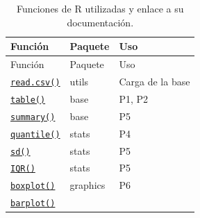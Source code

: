 \documentclass[oneside, openany, fontset=libertinus]{mitthesis}
\begin{document}
\begin{longtable}[]{@{}
  >{\raggedright\arraybackslash}p{}
  >{\raggedright\arraybackslash}p{}
  >{\raggedright\arraybackslash}p{}@{}}
\caption{Funciones de R utilizadas y enlace a su
documentación.}\tabularnewline
\toprule\noalign{}
\begin{minipage}[b]{\linewidth}\raggedright
Función
\end{minipage} & \begin{minipage}[b]{\linewidth}\raggedright
Paquete
\end{minipage} & \begin{minipage}[b]{\linewidth}\raggedright
Uso
\end{minipage} \\
\midrule\noalign{}
\endfirsthead
\toprule\noalign{}
\begin{minipage}[b]{\linewidth}\raggedright
Función
\end{minipage} & \begin{minipage}[b]{\linewidth}\raggedright
Paquete
\end{minipage} & \begin{minipage}[b]{\linewidth}\raggedright
Uso
\end{minipage} \\
\midrule\noalign{}
\endhead
\bottomrule\noalign{}
\endlastfoot
\href{https://stat.ethz.ch/R-manual/R-devel/library/utils/html/read.table.html}{\texttt{read.csv()}}
& utils & Carga de la base \\
\href{https://stat.ethz.ch/R-manual/R-devel/library/base/html/table.html}{\texttt{table()}}
& base & P1, P2 \\
\href{https://stat.ethz.ch/R-manual/R-devel/library/base/html/summary.html}{\texttt{summary()}}
& base & P5 \\
\href{https://stat.ethz.ch/R-manual/R-devel/library/stats/html/quantile.html}{\texttt{quantile()}}
& stats & P4 \\
\href{https://stat.ethz.ch/R-manual/R-devel/library/stats/html/sd.html}{\texttt{sd()}}
& stats & P5 \\
\href{https://stat.ethz.ch/R-manual/R-devel/library/stats/html/IQR.html}{\texttt{IQR()}}
& stats & P5 \\
\href{https://stat.ethz.ch/R-manual/R-devel/library/graphics/html/boxplot.html}{\texttt{boxplot()}}
& graphics & P6 \\
\href{https://stat.ethz.ch/R-manual/R-devel/library/graphics/html/barplot.html}{\texttt{barplot()}}

\end{longtable}
\end{document}
